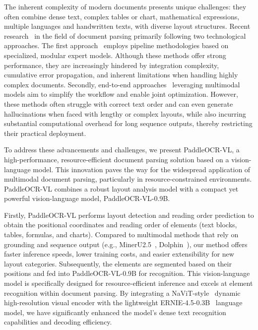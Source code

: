 \documentclass[11pt, a4paper,logo,  copyright, nonumbering]{paddleocr}
\begin{document}
The inherent complexity of modern documents presents unique challenges: they often combine dense text, complex tables or chart, mathematical expressions, multiple languages and handwritten texts, with diverse layout structures. Recent research~\cite{li2025monkeyocr,wang2024mineru,cui2025paddleocr,Docling_Team_Docling,poznanski2025olmocr} in the field of document parsing primarily following two technological  approaches. The first approach~\cite{wang2024mineru,cui2025paddleocr} employs pipeline methodologies based on specialized, modular expert models. Although these methods offer strong performance, they are increasingly hindered by integration complexity, cumulative error propagation, and inherent limitations when handling highly complex documents. Secondly, end-to-end approaches~\cite{poznanski2025olmocr, nassar2025smoldocling, MinerU2} leveraging multimodal models aim to simplify the workflow and enable joint optimization. However, these methods often struggle with correct text order and can even generate hallucinations when faced with lengthy or complex layouts, while also incurring substantial computational overhead for long sequence outputs, thereby restricting their practical deployment.


To address these advancements and challenges, we present PaddleOCR-VL, a high-performance, resource-efficient document parsing solution based on a vision-language model. This innovation paves the way for the widespread application of multimodal document parsing, particularly in resource-constrained environments. 
PaddleOCR-VL combines a robust layout analysis model with a compact yet powerful vision-language model, PaddleOCR-VL-0.9B. 

Firstly, PaddleOCR-VL performs layout detection and reading order prediction to obtain the positional coordinates and reading order of elements (text blocks, tables, formulas, and charts). Compared to multimodal methods that rely on grounding and sequence output (e.g., MinerU2.5~\cite{niu2025mineru2}, Dolphin~\cite{feng2025dolphin}), our method offers faster inference speeds, lower training costs, and easier extensibility for new layout categories. Subsequently, the elements are segmented based on their positions and fed into PaddleOCR-VL-0.9B for recognition. This vision-language model is specifically designed for resource-efficient inference and excels at element recognition within document parsing. By integrating a NaViT-style~\cite{dehghani2023patch} dynamic high-resolution visual encoder with the lightweight ERNIE-4.5-0.3B~\cite{ernie2025technicalreport} language model, we have significantly enhanced the model’s dense text recognition capabilities and decoding efficiency. 
\end{document}
